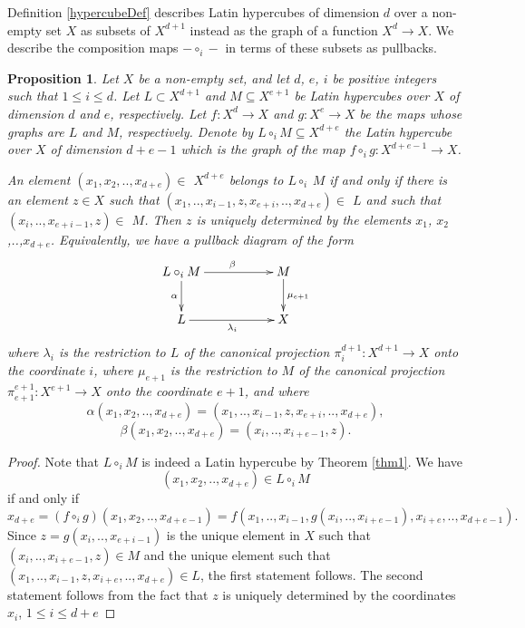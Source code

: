 \documentclass{amsart} %
\theoremstyle{plain}\newtheorem{Theorem}{Theorem}[section]
\theoremstyle{plain}\newtheorem{Conjecture}[Theorem]{Conjecture}
\theoremstyle{plain}\newtheorem{Corollary}[Theorem]{Corollary}
\theoremstyle{plain}\newtheorem{Lemma}[Theorem]{Lemma}
\theoremstyle{plain}\newtheorem{Proposition}[Theorem]{Proposition}
\theoremstyle{definition}\newtheorem{Definition}[Theorem]{Definition}
\theoremstyle{definition}\newtheorem{Example}[Theorem]{Example}
\theoremstyle{definition}\newtheorem{Examples}[Theorem]{Examples}
\theoremstyle{definition}\newtheorem{Remark}[Theorem]{Remark}
\theoremstyle{definition}\newtheorem{Remarks}[Theorem]{Remarks}
\theoremstyle{plain}\newtheorem{Statement}[Theorem]{}
\begin{document}
Definition \ref{hypercubeDef} describes  Latin hypercubes 
of dimension $d$ over a non-empty set $X$ as subsets of $X^{d+1}$ instead as the 
graph of a  function $X^d\to X$.  
We  describe the composition maps $-\circ_i -$  in terms  of these subsets as pullbacks.

\begin{Proposition} \label{iProp}
Let $X$ be a non-empty set, and let $d$, $e$, $i$  be positive integers such 
that $1\leq i\leq d$. 
Let $L\subset X^{d+1}$ and  $M\subseteq X^{e+1}$ be Latin hypercubes over $X$
of dimension $d$ and $e$, respectively.
Let $f : X^d\to X$ and $g : X^e \to X$ be the maps whose graphs are $L$ and $M$,
respectively. Denote by $L\circ_i M\subseteq X^{d+e}$  the Latin hypercube over $X$ 
of dimension $d+e-1$ which is the graph of the map $f\circ_i g : X^{d+e-1}\to X$.

An element $(x_1,x_2,..,x_{d+e})\in$ $X^{d+e}$ belongs to $L\circ_i~M$ if and only if 
there is an element $z\in X$ such that $(x_1,..,x_{i-1},z,x_{e+i},..,x_{d+e})\in$ $L$ and 
such that $(x_i,..,x_{e+i-1},z)\in$ $M$.
Then $z$ is uniquely determined by the elements $x_1$, $x_2$,..,$x_{d+e}$.
Equivalently, we have a pullback diagram of the form
$$\xymatrix{ L\circ_i M \ar[rr]^\beta \ar[d]_\alpha  & &  M \ar[d]^{\mu_{e+1}} \\
L \ar[rr]_{\lambda_i} & & X}$$
where $\lambda_i$ is the restriction to $L$ of the canonical projection 
$\pi^{d+1}_i : X^{d+1}\to X$ onto the coordinate $i$, where $\mu_{e+1}$ is the restriction 
to $M$ of the canonical projection $\pi^{e+1}_{e+1} : X^{e+1}\to X$ onto the coordinate 
$e+1$, and where 
$$\alpha(x_1,x_2,..,x_{d+e}) = (x_1,..,x_{i-1},z,x_{e+i},..,x_{d+e}),$$
$$\beta(x_1,x_2,..,x_{d+e}) = (x_i,..,x_{i+e-1},z).$$
\end{Proposition}

\begin{proof}
Note that  $L\circ_i M$ is indeed a Latin hypercube  by Theorem \ref{thm1}.
We have 
$$(x_1,x_2,..,x_{d+e})\in L\circ_i M$$ 
if and only if
$$x_{d+e} = (f\circ_i g)(x_1,x_2,..,x_{d+e-1}) = 
f(x_1,..,x_{i-1}, g(x_i,..,x_{i+e-1}),x_{i+e},..,x_{d+e-1}).$$
Since 
$z=g(x_i,..,x_{e+i-1})$
is the unique element in $X$ such that $(x_i,..,x_{i+e-1},z)\in M$ and the unique
element such that $(x_1,..,x_{i-1},z,x_{i+e},..,x_{d+e})\in L$, the first statement follows.
The second statement follows from the fact that $z$ is uniquely determined by the 
coordinates $x_i$, $1\leq i \leq d+e$ 
\end{proof}
\end{document}
